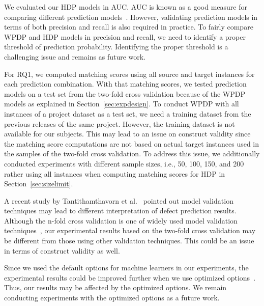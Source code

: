 We evaluated our HDP models in AUC.
	AUC is known as a good measure for comparing different prediction
	models~\cite{Giger12,Lessmann08,Rahman12,Song11}. However, validating
	prediction models in terms of both precision and recall is also required in
	practice. To fairly compare WPDP and HDP models in precision
	and recall, we need to identify a proper threshold of prediction probability.
	Identifying the proper threshold is a challenging issue and remains as
	future work.

For RQ1, we computed matching scores using all
	source and target instances for each prediction combination.
	With that matching scores, we tested prediction models on a test set from the two-fold cross validation because of the WPDP models as explained in Section~\ref{sec:expdesign}.
	To conduct WPDP with all instances of a project dataset as a test set, we need a training dataset from the previous releases of the same project. However, the training dataset is not
	available for our subjects. This may lead to an issue on construct validity since the matching score computations are not based on actual target instances used in the samples of the two-fold cross validation. To address this issue, we additionally conducted experiments with different sample sizes, i.e., 50, 100, 150, and 200 rather using all instances when computing matching scores for HDP in Section~\ref{sec:sizelimit}.

A recent study by Tantithamthavorn et al.~\cite{Tantithamthavorn16} pointed out model validation techniques may lead to different interpretation of defect prediction results. Although the n-fold cross validation is one of widely used model validation techniques~\cite{Klas2010,Nam13,Pinzger2008}, our experimental results based on the two-fold cross validation may be different from those using other validation techniques. This could be an issue in terms of construct validity as well.

Since we used the default options for machine learners in our experiments, the experimental results could be improved further when we use optimized options~\cite{Tantithamthavorn16icse,Fu2016}. Thus, our results may be affected by the optimized options. We remain conducting experiments with the optimized options as a future work. 
	

